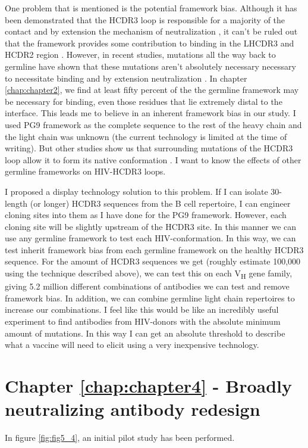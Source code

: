 One problem that is mentioned is the potential framework bias. Although it has been demonstrated that the HCDR3 loop is responsible for a majority of the contact and by extension the mechanism of neutralization \citep{Pejchal:2010fp,Pancera:2010hh}, it can't be ruled out that the framework provides some contribution to binding in the LHCDR3 and HCDR2 region \citep{McLellan:2011dg}. However, in recent studies, mutations all the way back to germline have shown that these mutations aren't absolutely necessary necessary to necessitate binding and by extension neutralization \citep{Klein:2013iz}. In chapter \ref{chap:chapter2}, we find at least fifty percent of the the germline framework may be necessary for binding, even those residues that lie extremely distal to the interface. This leads me to believe in an inherent framework bias in our study. I used PG9 framework as the complete sequence to the rest of the heavy chain and the light chain was unknown (the current technology is limited at the time of writing). But other studies show us that surrounding mutations of the HCDR3 loop allow it to form its native conformation \citep{Wong:2011ff}. I want to know the effects of other germline frameworks on HIV-\naive HCDR3 loops.

I proposed a display technology solution to this problem. If I can isolate 30-length (or longer) HCDR3 sequences from the B cell repertoire, I can engineer cloning sites into them as I have done for the PG9 framework. However, each cloning site will be slightly upstream of the HCDR3 site. In this manner we can use any germline framework to test each HIV-\naive conformation. In this way, we can test inherit framework bias from each germline framework on the healthy HCDR3 sequence. For the amount of HCDR3 sequences we get (roughly estimate 100,000 using the technique described above), we can test this on each V\textsubscript{H} gene family, giving 5.2 million different combinations of antibodies we can test and remove framework bias. In addition, we can combine germline light chain repertoires to increase our combinations. I feel like this would be like an incredibly useful experiment to find antibodies from HIV-\naive donors with the absolute minimum amount of mutations. In this way I can get an absolute threshold to describe what a vaccine will need to elicit using a very inexpensive technology.

\section{Chapter \ref{chap:chapter4} - Broadly neutralizing antibody redesign}
In figure \ref{fig:fig5_4}, an initial pilot study has been performed.


